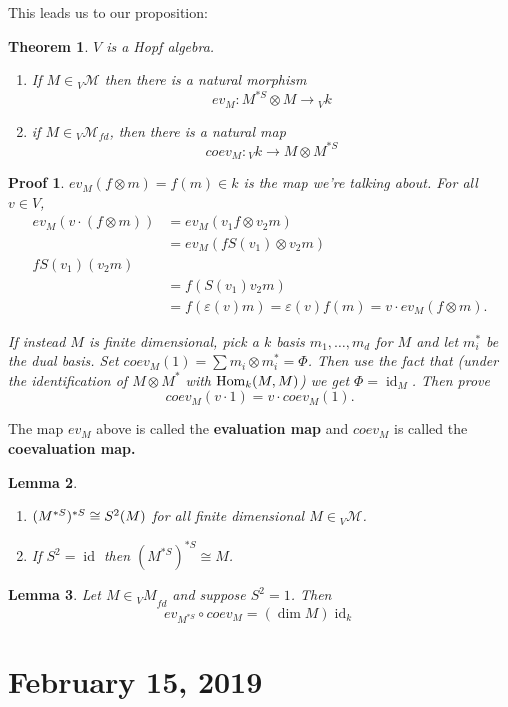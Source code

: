 \documentclass[12pt]{article}
\theoremstyle{break}
\theoremstyle{nonumberbreak}
\theoremstyle{changebreak}
\newtheorem{thm}{Theorem}[subsection]
\newtheorem{lem}[thm]{Lemma}
\theoremstyle{break}
\theoremstyle{nonumberbreak}
\newtheorem{prf}{Proof}
\theoremstyle{nonumberplain}
\theoremstyle{change}
\DeclareMathOperator{\id}{id}
\newcommand*{\Hom}{\ensuremath\text{Hom}}
\newcommand*{\calM}{\mathcal{M}}
\let\tilde\relax
\newcommand*{\tilde}[1]{\widetilde{#1}}
\begin{document}
This leads us to our proposition:
\begin{thm}
	$V$ is a Hopf algebra.
	\begin{enumerate}
		\item If $M\in{_V\calM}$ then there is a natural morphism
		\[ev_M:M^{*S}\otimes M\to {_Vk}\]
		\item if $M\in{_V\calM_{fd}}$, then there is a natural map
		\[coev_M:{_Vk}\to M\otimes M^{*S}\]
	\end{enumerate}
\end{thm}
\begin{prf}
	$ev_M(f\otimes m)=f(m)\in k$ is the map we're talking about. For all $v\in V$, 
	\begin{align*}
		ev_M(v\cdot(f\otimes m))&=ev_M(v_1f\otimes v_2 m)\\
		&=ev_M(fS(v_1)\otimes v_2m)\\
		fS(v_1)(v_2 m)\\
		&= f(S(v_1)v_2m)\\
		&= f(\varepsilon(v) m)=\varepsilon(v)f(m)=v\cdot ev_M(f\otimes m).
	\end{align*}

	If instead $M$ is finite dimensional, pick a $k$ basis $m_1,\dots,m_d$ for $M$ and let 
	$m_i^*$ be the dual basis. Set $coev_M(1)=\sum m_i\otimes m_i^*=\Phi$. Then use the fact that (under the identification of 
	$M\otimes M^*$ with $\Hom_k(M,M)$) we get $\Phi=\id_M$. Then prove 
	\[coev_M(v\cdot 1)=v\cdot coev_M(1).\]
\end{prf}
\begin{defn}
	The map $ev_M$ above is called the \textbf{evaluation map} and $coev_M$ is called the 
	\textbf{coevaluation map.}
\end{defn}

\begin{lem}
	\begin{enumerate}
		\item $(M^{*S})^{*S}\cong \tilde S^2(M)$ for all finite dimensional $M\in{_V\calM}$.
		\item If $S^2=\id$ then $(M^{*S})^{*S}\cong M$.
	\end{enumerate}
\end{lem}
\begin{lem}
	Let $M\in {_VM}_{fd}$ and suppose $S^2=1$. Then 
	\[ev_{M^{*S}}\circ coev_M=(\dim M)\id_k\]
\end{lem}

\section{February 15, 2019}
\end{document}
